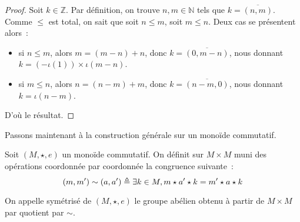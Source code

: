 \begin{proof}
  Soit $k \in \mathbb Z$. Par définition, on trouve $n,m\in\mathbb N$ tels que
  $k = \overline{(n,m)}$. Comme $\leq$ est total, on sait que soit
  $n \leq m$, soit $m \leq n$. Deux cas se présentent alors~:
  \begin{itemize}
  \item si $n \leq m$, alors $m = (m - n) + n$, donc $k = \overline{(0,m - n)}$,
    nous donnant $k = (-\iota(1))\times \iota(m-n)$.
  \item si $m \leq n$, alors $n = (n - m) + m$, donc
    $k = \overline{(n - m, 0)}$, nous donnant $k = \iota(n-m)$.
  \end{itemize}
  D'où le résultat.
\end{proof}

Passons maintenant à la construction générale sur un monoïde commutatif.

\begin{definition}
  Soit $(M,\star,e)$ un monoïde commutatif. On définit sur $M\times M$ muni des
  opérations coordonnée par coordonnée la congruence suivante~:
  \[(m,m') \sim (a,a') \triangleq \exists k \in M, m \star a' \star k
  = m' \star a \star k\]

  On appelle symétrisé de $(M,\star,e)$ le groupe abélien obtenu à partir de
  $M\times M$ par quotient par $\sim$.
\end{definition}

